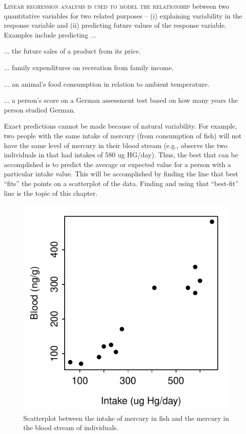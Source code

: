 \documentclass[10pt,openany]{book}\usepackage[]{graphicx}\usepackage[]{color}
\newenvironment{knitrout}{}{} %
\begin{document}
\minitoc
\newpage

\lettrine{L}{inear regression analysis is used to model the relationship} between two quantitative variables for two related purposes -- (i) explaining variability in the response variable and (ii) predicting future values of the response variable.  Examples include predicting ...
\begin{Itemize}
  \item ... the future sales of a product from its price.
  \item ... family expenditures on recreation from family income.
  \item ... an animal's food consumption in relation to ambient temperature.
  \item ... a person's score on a German assessment test based on how many years the person studied German.
\end{Itemize}


Exact predictions cannot be made because of natural variability.  For example, two people with the same intake of mercury (from consumption of fish) will not have the same level of mercury in their blood stream (e.g., observe the two individuals in  that had intakes of 580 ug HG/day).  Thus, the best that can be accomplished is to predict the average or expected value for a person with a particular intake value.  This will be accomplished by finding the line that best ``fits'' the points on a scatterplot of the data.  Finding and using that ``best-fit'' line is the topic of this chapter.

\begin{knitrout}
\color{fgcolor}\begin{figure}[hbtp]

{\centering \includegraphics[width=.4\linewidth]{Figs/HGscat-1} 

}

\caption[Scatterplot between the intake of mercury in fish and the mercury in the blood stream of individuals]{Scatterplot between the intake of mercury in fish and the mercury in the blood stream of individuals.}\label{fig:HGscat}
\end{figure}


\end{knitrout}
\end{document}
